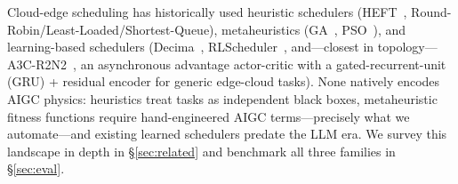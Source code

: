 Cloud-edge scheduling has historically used heuristic
schedulers (HEFT~\cite{topcuoglu2002heft},
Round-Robin/Least-Loaded/Shortest-Queue), metaheuristics
(GA~\cite{holland1975adaptation},
PSO~\cite{kennedy1995pso}), and learning-based schedulers
(Decima~\cite{mao2019decima},
RLScheduler~\cite{zhang2020rlscheduler}, and---closest in
topology---A3C-R2N2~\cite{tuli2022a3cr2n}, an asynchronous
advantage actor-critic with a gated-recurrent-unit (GRU) +
residual encoder for generic edge-cloud tasks). None natively
encodes AIGC physics: heuristics treat tasks as independent
black boxes, metaheuristic fitness functions require
hand-engineered AIGC terms---precisely what we automate---and
existing learned schedulers predate the LLM era. We survey
this landscape in depth in \S\ref{sec:related} and benchmark
all three families in \S\ref{sec:eval}.
